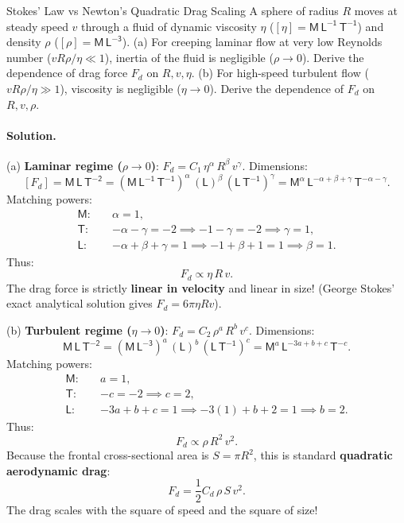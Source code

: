 \begin{workedexample}{Stokes' Law vs Newton's Quadratic Drag Scaling}
A sphere of radius $R$ moves at steady speed $v$ through a fluid of dynamic viscosity $\eta$ ($[\eta] = \mathsf{M\,L^{-1}\,T^{-1}}$) and density $\rho$ ($[\rho] = \mathsf{M\,L^{-3}}$).
(a) For creeping laminar flow at very low Reynolds number ($v R \rho / \eta \ll 1$), inertia of the fluid is negligible ($\rho \to 0$). Derive the dependence of drag force $F_d$ on $R, v, \eta$.
(b) For high-speed turbulent flow ($v R \rho / \eta \gg 1$), viscosity is negligible ($\eta \to 0$). Derive the dependence of $F_d$ on $R, v, \rho$.

\paragraph{Solution.}

(a) \textbf{Laminar regime ($\rho \to 0$)}: $F_d = C_1\,\eta^\alpha\,R^\beta\,v^\gamma$.
Dimensions:
\[
[F_d] = \mathsf{M\,L\,T^{-2}} = (\mathsf{M\,L^{-1}\,T^{-1}})^\alpha\,(\mathsf{L})^\beta\,(\mathsf{L\,T^{-1}})^\gamma = \mathsf{M}^\alpha\,\mathsf{L}^{-\alpha + \beta + \gamma}\,\mathsf{T}^{-\alpha - \gamma}.
\]
Matching powers:
\begin{align*}
\mathsf{M}:\quad & \alpha = 1, \\
\mathsf{T}:\quad & -\alpha - \gamma = -2 \implies -1 - \gamma = -2 \implies \gamma = 1, \\
\mathsf{L}:\quad & -\alpha + \beta + \gamma = 1 \implies -1 + \beta + 1 = 1 \implies \beta = 1.
\end{align*}
Thus:
\[
\boxed{F_d \propto \eta\,R\,v.}
\]
The drag force is strictly \textbf{linear in velocity} and linear in size! (George Stokes' exact analytical solution gives $F_d = 6\pi\eta R v$).

(b) \textbf{Turbulent regime ($\eta \to 0$)}: $F_d = C_2\,\rho^a\,R^b\,v^c$.
Dimensions:
\[
\mathsf{M\,L\,T^{-2}} = (\mathsf{M\,L^{-3}})^a\,(\mathsf{L})^b\,(\mathsf{L\,T^{-1}})^c = \mathsf{M}^a\,\mathsf{L}^{-3a + b + c}\,\mathsf{T}^{-c}.
\]
Matching powers:
\begin{align*}
\mathsf{M}:\quad & a = 1, \\
\mathsf{T}:\quad & -c = -2 \implies c = 2, \\
\mathsf{L}:\quad & -3a + b + c = 1 \implies -3(1) + b + 2 = 1 \implies b = 2.
\end{align*}
Thus:
\[
\boxed{F_d \propto \rho\,R^2\,v^2.}
\]
Because the frontal cross-sectional area is $S = \pi R^2$, this is standard \textbf{quadratic aerodynamic drag}:
\[
F_d = \frac{1}{2}C_d\,\rho\,S\,v^2.
\]
The drag scales with the square of speed and the square of size!
\end{workedexample}
